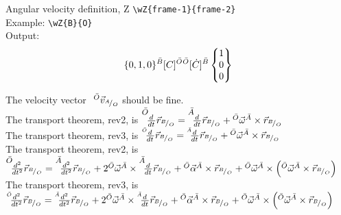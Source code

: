 \documentclass{article}
\begin{document}
\noindent
Angular velocity definition, Z \verb|\wZ{frame-1}{frame-2}|\\
Example: \verb|\wZ{B}{O}|\\
Output:
\begin{equation*}
    \{0, 1, 0\} {}^{\bar{B}}\lbrack{C}\rbrack^{\bar{O}} {}^{\bar{O}}\lbrack{\dot{C}}\rbrack^{\bar{B}} \begin{Bmatrix} {1} \\ {0} \\ {0} \end{Bmatrix} 
\end{equation*} 

\noindent The velocity vector $\,\,^{\bar{O}}{\vec{v}}_{{}^{A}\!/_{O}}$ should be fine.\\
\noindent The transport theorem, rev2, is $\TransOne{O}{A}{\PosVec{B}{O}}$ \\
\noindent The transport theorem, rev3, is $\iTransOne{O}{A}{\PosVec{B}{O}}$\\

\noindent The transport theorem, rev2, is $\TransTwo{O}{A}{\PosVec{B}{O}}$ \\
\noindent The transport theorem, rev3, is $\iTransTwo{O}{A}{\PosVec{B}{O}}$
\end{document}
